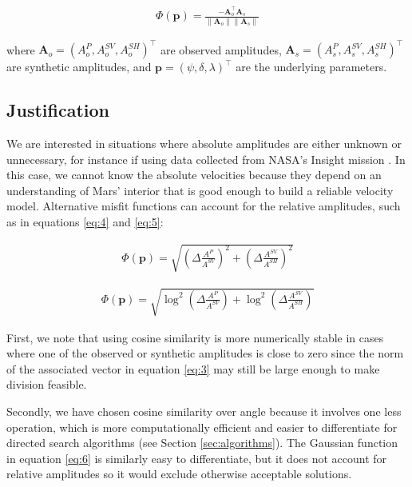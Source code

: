 \documentclass[preprint]{seismica}
\begin{document}
    \begin{align} \label{eq:3}
      \Phi(\bm{p}) = \frac{-\bm{A}_o^\top\bm{A}_s}{\|\bm{A}_o\|\|\bm{A}_s\|}
    \end{align}

    where $\bm{A}_o = (A_o^P, A_o^{SV}, A_o^{SH})^\top$ are observed amplitudes, $\bm{A}_s =
    (A_s^P, A_s^{SV}, A_s^{SH})^\top$ are synthetic amplitudes, and
    $\bm{p} = (\psi, \delta, \lambda)^\top$ are the underlying parameters.

  \subsection{Justification}
    We are interested in situations where absolute amplitudes are either unknown or unnecessary, for
    instance if using data collected from NASA's Insight mission \citep{sita_potential_2022}.
    In this case, we cannot know the absolute velocities because they depend on an understanding of
    Mars' interior that is good enough to build a reliable velocity model. Alternative misfit
    functions can account for the relative amplitudes, such as in equations \ref{eq:4} and
    \ref{eq:5}:

    \begin{align} \label{eq:4}
      \Phi(\bm{p}) = \sqrt{\left( \Delta \frac{A^{P}}{A^{SV}}\right)^2 + \left( \Delta \frac{A^{SV}}{A^{SH}}\right)^2}
    \end{align}

    \begin{align} \label{eq:5}
      \Phi(\bm{p}) = \sqrt{\log^2 \left( \Delta \frac{A^P}{A^{SV}} \right) + \log^2 \left( \Delta \frac{A^{SV}}{A^{SH}} \right)}
    \end{align}

    First, we note that using cosine similarity is more numerically stable in cases where one of the
    observed or synthetic amplitudes is close to zero since the norm of the associated vector in
    equation \ref{eq:3} may still be large enough to make division feasible.

    Secondly, we have chosen cosine similarity over angle because it involves one less operation,
    which is more computationally efficient and easier to differentiate for directed search
    algorithms (see Section \ref{sec:algorithms}). The Gaussian function in equation \ref{eq:6} is
    similarly easy to differentiate, but it does not account for relative amplitudes so it would
    exclude otherwise acceptable solutions.
\end{document}
